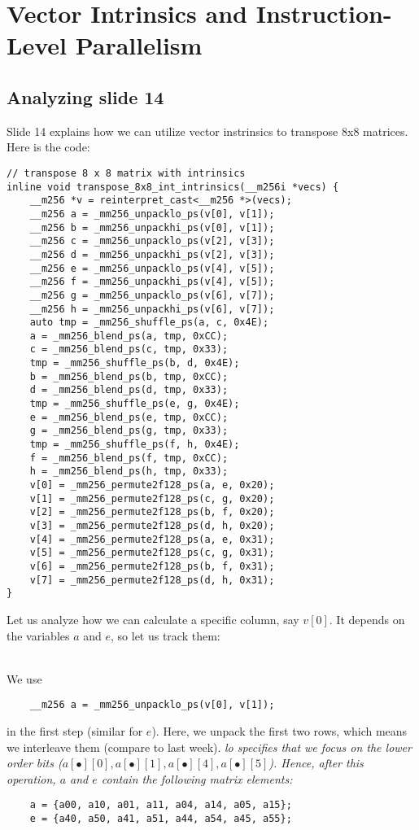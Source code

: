 \documentclass[../../main.tex]{subfiles}
\begin{document}
    \section{Vector Intrinsics and Instruction-Level Parallelism}
    \subsection{Analyzing slide 14}
    Slide 14 explains how we can utilize vector instrinsics to transpose 8x8 matrices. Here is the code:
    \begin{lstlisting}
// transpose 8 x 8 matrix with intrinsics
inline void transpose_8x8_int_intrinsics(__m256i *vecs) {
    __m256 *v = reinterpret_cast<__m256 *>(vecs);
    __m256 a = _mm256_unpacklo_ps(v[0], v[1]);
    __m256 b = _mm256_unpackhi_ps(v[0], v[1]);
    __m256 c = _mm256_unpacklo_ps(v[2], v[3]);
    __m256 d = _mm256_unpackhi_ps(v[2], v[3]);
    __m256 e = _mm256_unpacklo_ps(v[4], v[5]);
    __m256 f = _mm256_unpackhi_ps(v[4], v[5]);
    __m256 g = _mm256_unpacklo_ps(v[6], v[7]);
    __m256 h = _mm256_unpackhi_ps(v[6], v[7]);
    auto tmp = _mm256_shuffle_ps(a, c, 0x4E);
    a = _mm256_blend_ps(a, tmp, 0xCC);
    c = _mm256_blend_ps(c, tmp, 0x33);
    tmp = _mm256_shuffle_ps(b, d, 0x4E);
    b = _mm256_blend_ps(b, tmp, 0xCC);
    d = _mm256_blend_ps(d, tmp, 0x33);
    tmp = _mm256_shuffle_ps(e, g, 0x4E);
    e = _mm256_blend_ps(e, tmp, 0xCC);
    g = _mm256_blend_ps(g, tmp, 0x33);
    tmp = _mm256_shuffle_ps(f, h, 0x4E);
    f = _mm256_blend_ps(f, tmp, 0xCC);
    h = _mm256_blend_ps(h, tmp, 0x33);
    v[0] = _mm256_permute2f128_ps(a, e, 0x20);
    v[1] = _mm256_permute2f128_ps(c, g, 0x20);
    v[2] = _mm256_permute2f128_ps(b, f, 0x20);
    v[3] = _mm256_permute2f128_ps(d, h, 0x20);
    v[4] = _mm256_permute2f128_ps(a, e, 0x31);
    v[5] = _mm256_permute2f128_ps(c, g, 0x31);
    v[6] = _mm256_permute2f128_ps(b, f, 0x31);
    v[7] = _mm256_permute2f128_ps(d, h, 0x31);
}
    \end{lstlisting}
Let us analyze how we can calculate a specific column, say $v[0]$. It depends on the variables $a$ and $e$, so let us track them:

~\\
We use
\begin{lstlisting}
    __m256 a = _mm256_unpacklo_ps(v[0], v[1]);
\end{lstlisting}
in the first step (similar for $e$). Here, we unpack the first two rows, which means we interleave them (compare to last week). \em lo \em specifies that we focus on the \em lower order bits \em ($a[\bullet][0], a[\bullet][1], a[\bullet][4], a[\bullet][5]$). Hence, after this operation, $a$ and $e$ contain the following matrix elements:
\begin{lstlisting}
    a = {a00, a10, a01, a11, a04, a14, a05, a15};
    e = {a40, a50, a41, a51, a44, a54, a45, a55};
\end{lstlisting}
\end{document}
